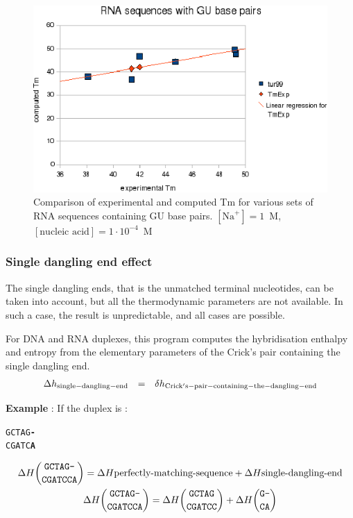 \documentclass{article}
\begin{document}
\begin{figure}[h]
\includegraphics[width=1\linewidth]{images/GUBasePairs}
\caption{Comparison of experimental and computed Tm for various sets of
 RNA sequences containing GU base pairs. $[\mbox{Na}^+] = 1$~M, $[\mbox{nucleic acid}] = 1\cdot{}10^{-4}$~M}
\end{figure}

\subsubsection{Single dangling end effect}

The single dangling ends, that is the unmatched terminal nucleotides, can be taken into
account, but all the thermodynamic parameters are not available. In such a case, 
the result is unpredictable, and all cases are possible. 

For DNA and RNA duplexes, this program computes the hybridisation enthalpy and entropy from the elementary 
parameters of the Crick's pair containing the single dangling end. 
\begin{displaymath}
  \begin{array}[t]{ccc}
  \Delta{}h_\mathrm{single-dangling-end}&=&\delta{}h_\mathrm{Crick's-pair-containing-the-dangling-end}\\
  \end{array}
\end{displaymath}

\textbf{Example} :
If the duplex is :
\begin{alltt}
GCTAG\textbf{-}
CGATC\textbf{A}
\end{alltt}
\begin{multline*}
\Delta H {\mbox{\texttt{GCTAG-}} \choose \mbox{\texttt{CGATCCA}}} =
\Delta H {\mbox{perfectly-matching-sequence}} +
\Delta H {\mbox{single-dangling-end}} \\
\Delta H {\mbox{\texttt{GCTAG-}} \choose \mbox{\texttt{CGATCCA}}} =
\Delta H {\mbox{\texttt{GCTAG}} \choose \mbox{\texttt{CGATCC}}} +
\Delta H {\mbox{\texttt{G-}} \choose \mbox{\texttt{CA}}} \\
\end{multline*}
\end{document}
